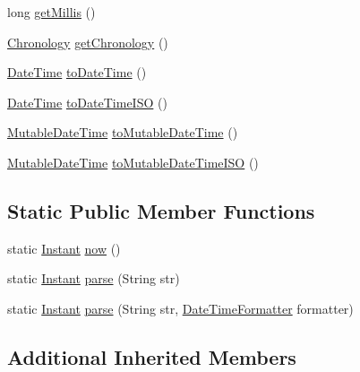 \begin{DoxyCompactItemize}
\item 
long \hyperlink{classorg_1_1joda_1_1time_1_1_instant_afb20557b079092cd23cc4fd3c41b6506}{get\-Millis} ()
\item 
\hyperlink{classorg_1_1joda_1_1time_1_1_chronology}{Chronology} \hyperlink{classorg_1_1joda_1_1time_1_1_instant_a412135b8a9db9e05fd1dc4027636ef28}{get\-Chronology} ()
\item 
\hyperlink{classorg_1_1joda_1_1time_1_1_date_time}{Date\-Time} \hyperlink{classorg_1_1joda_1_1time_1_1_instant_a55da6a98cdd899699f84af6a882f8fe6}{to\-Date\-Time} ()
\item 
\hyperlink{classorg_1_1joda_1_1time_1_1_date_time}{Date\-Time} \hyperlink{classorg_1_1joda_1_1time_1_1_instant_a13044ac592e993af07a3ac2d471775ab}{to\-Date\-Time\-I\-S\-O} ()
\item 
\hyperlink{classorg_1_1joda_1_1time_1_1_mutable_date_time}{Mutable\-Date\-Time} \hyperlink{classorg_1_1joda_1_1time_1_1_instant_ad5ce42b0957abf060a8d331ffc7e971b}{to\-Mutable\-Date\-Time} ()
\item 
\hyperlink{classorg_1_1joda_1_1time_1_1_mutable_date_time}{Mutable\-Date\-Time} \hyperlink{classorg_1_1joda_1_1time_1_1_instant_a17ed769b8460d9d768e0912e24449feb}{to\-Mutable\-Date\-Time\-I\-S\-O} ()
\end{DoxyCompactItemize}
\subsection*{Static Public Member Functions}
\begin{DoxyCompactItemize}
\item 
static \hyperlink{classorg_1_1joda_1_1time_1_1_instant}{Instant} \hyperlink{classorg_1_1joda_1_1time_1_1_instant_a2e0d7f3464738092fe17542213ad2114}{now} ()
\item 
static \hyperlink{classorg_1_1joda_1_1time_1_1_instant}{Instant} \hyperlink{classorg_1_1joda_1_1time_1_1_instant_a22ee26694733956c13d0eb3361b1def4}{parse} (String str)
\item 
static \hyperlink{classorg_1_1joda_1_1time_1_1_instant}{Instant} \hyperlink{classorg_1_1joda_1_1time_1_1_instant_a071ba1ef900f6e55260953ebab49d7ca}{parse} (String str, \hyperlink{classorg_1_1joda_1_1time_1_1format_1_1_date_time_formatter}{Date\-Time\-Formatter} formatter)
\end{DoxyCompactItemize}
\subsection*{Additional Inherited Members}


